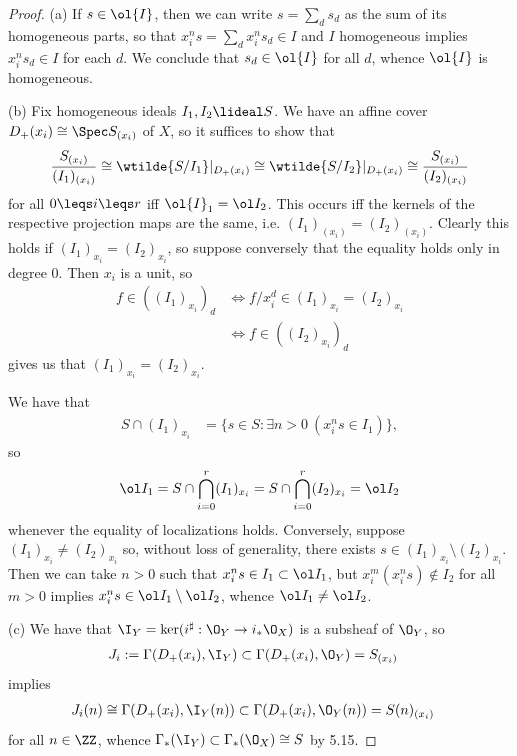 \documentclass[12pt]{amsart}
\begin{document}
\begin{proof}
  (a) If $s\in \ol{I}$, then we can write $s= \sum_ds_d$ as the sum of its homogeneous parts, so that $x_i^ns=\sum_dx_i^ns_d\in I$ and $I$ homogeneous implies $x_i^ns_d\in I$ for each $d$.
  We conclude that $s_d\in \ol{I}$ for all $d$, whence $\ol{I}$ is homogeneous.

  (b) Fix homogeneous ideals $I_1,I_2\lideal S$.
  We have an affine cover $D_+(x_i)\cong \Spec S_{(x_i)}$ of $X$, so it suffices to show that
  \[
    \frac{S_{(x_i)}}{(I_1)_{(x_i)}}
    \cong \wtilde{S/I_1}|_{D_+(x_i)}
    \cong \wtilde{S/I_2}|_{D_+(x_i)}
    \cong \frac{S_{(x_i)}}{(I_2)_{(x_i)}}
  \]
  for all $0\leqs i\leqs r$ iff $\ol{I}_1=\ol I_2$.
  This occurs iff the kernels of the respective projection maps are the same, i.e. $(I_1)_{(x_i)}= (I_2)_{(x_i)}$.
  Clearly this holds if $(I_1)_{x_i}=(I_2)_{x_i}$, so suppose conversely that the equality holds only in degree 0.
  Then $x_i$ is a unit, so
  \begin{align*}
    f\in ((I_1)_{x_i})_d
    &\iff f/x_i^d\in (I_1)_{x_i}=(I_2)_{x_i} \\
    &\iff f\in((I_2)_{x_i})_d
  \end{align*}
  gives us that $(I_1)_{x_i}=(I_2)_{x_i}$.

  We have that
  \begin{align*}
    S\cap (I_1)_{x_i} &= \{s\in S:\exists n>0~ (x_i^ns\in I_1)\},
  \end{align*}
  so
  \[
    \ol I_1 = S\cap \bigcap_{i=0}^r(I_1)_{x_i} =S\cap\bigcap_{i=0}^r(I_2)_{x_i}=\ol I_2
  \]
  whenever the equality of localizations holds.
  Conversely, suppose $(I_1)_{x_i}\neq (I_2)_{x_i}$ so, without loss of generality, there exists $s\in (I_1)_{x_i}\setminus (I_2)_{x_i}$.
  Then we can take $n>0$ such that $x_i^ns\in I_1\subset\ol I_1$, but $x_i^m(x_i^ns)\notin I_2$ for all $m>0$ implies $x_i^ns\in \ol I_1\setminus \ol I_2$, whence $\ol I_1\neq \ol I_2$.

  (c) We have that $\I_Y=\ker (i^\sharp:\O_Y\to i_*\O_X)$ is a subsheaf of $\O_Y$, so
  \begin{align*}
    J_i:=\Gamma(D_+(x_i),\I_Y)&\subset \Gamma(D_+(x_i),\O_Y)=S_{(x_i)}
  \end{align*}
  implies
  \begin{align*}
    J_i(n)\cong \Gamma(D_+(x_i),\I_Y(n))&\subset \Gamma(D_+(x_i),\O_Y(n))=S(n)_{(x_i)}
  \end{align*}
  for all $n\in \ZZ$,
  whence $\Gamma_*(\I_Y)\subset \Gamma_*(\O_X)\cong S$ by 5.15.


\end{proof}
\end{document}
